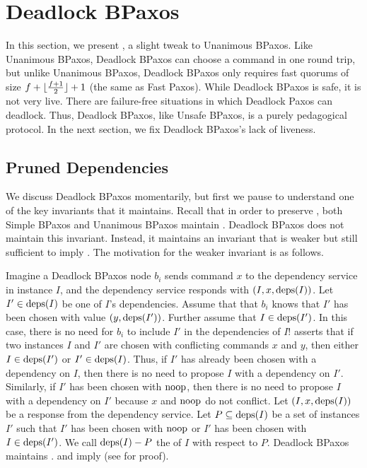 \section{Deadlock BPaxos}
In this section, we present , a slight tweak to
Unanimous BPaxos. Like Unanimous BPaxos, Deadlock BPaxos can choose a command
in one round trip, but unlike Unanimous BPaxos, Deadlock BPaxos only requires
fast quorums of size $f + \lfloor\frac{f + 1}{2}\rfloor + 1$ (the same as Fast Paxos).
%
While Deadlock BPaxos is safe, it is not very live. There are failure-free
situations in which Deadlock Paxos can deadlock. Thus, Deadlock BPaxos, like
Unsafe BPaxos, is a purely pedagogical protocol. In the next section, we fix
Deadlock BPaxos's lack of liveness.

\subsection{Pruned Dependencies}
We discuss Deadlock BPaxos momentarily, but first we pause to understand one of
the key invariants that it maintains. Recall that in order to preserve
, both Simple BPaxos and Unanimous BPaxos maintain
.
%
Deadlock BPaxos does not maintain this invariant. Instead, it maintains an
invariant that is weaker but still sufficient to imply
. The motivation for the weaker invariant is as
follows.

Imagine a Deadlock BPaxos node $b_i$ sends command $x$ to the dependency
service in instance $I$, and the dependency service responds with $(I, x,
\text{deps}(I))$. Let $I' \in \text{deps}(I)$ be one of $I$'s dependencies. Assume that
that $b_i$ knows that $I'$ has been chosen with value $(y, \text{deps}(I'))$. Further
assume that $I \in \text{deps}(I')$. In this case, there is no need for $b_i$ to
include $I'$ in the dependencies of $I$!  asserts
that if two instances $I$ and $I'$ are chosen with conflicting commands $x$ and
$y$, then either $I \in \text{deps}(I')$ or $I' \in \text{deps}(I)$. Thus, if $I'$ has
already been chosen with a dependency on $I$, then there is no need to propose
$I$ with a dependency on $I'$.
%
Similarly, if $I'$ has been chosen with $\text{noop}$, then there is no need to
propose $I$ with a dependency on $I'$ because $x$ and $\text{noop}$ do not conflict.
%
Let $(I, x, \text{deps}(I))$ be a response from the dependency service. Let $P
\subseteq \text{deps}(I)$ be a set of instances $I'$ such that $I'$ has been chosen
with $\text{noop}$ or $I'$ has been chosen with $I \in \text{deps}(I')$. We call $\text{deps}(I)
- P$ the  of $I$ with respect to $P$. Deadlock
BPaxos maintains .  and
 imply  (see
 for proof).

